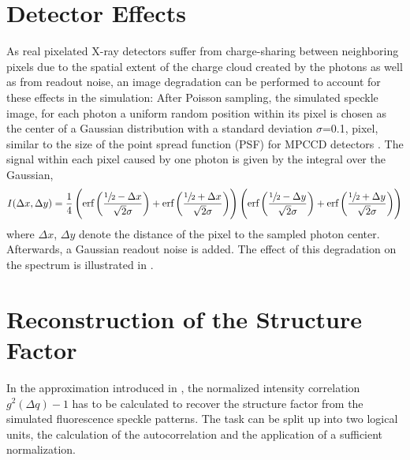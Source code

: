\section{Detector Effects}
\label{sec:chargesharing}
As real pixelated X-ray detectors suffer from charge-sharing between neighboring pixels due to the spatial extent of the charge cloud created by the photons as well as from readout noise, an image degradation can be performed to account for these effects in the simulation: After Poisson sampling, the simulated speckle image, for each photon a uniform random position within its pixel is chosen as the center of a Gaussian distribution with a  standard deviation $\sigma$=0.1, pixel, similar to the size of the point spread function (PSF) for MPCCD detectors \cite{mpccd}.
The signal within each pixel caused by one photon is given by the integral over the Gaussian,
\begin{equation*}
	I(\Delta x,\Delta y)=\frac{1}{4} \left(\text{erf}\left(\frac{\sfrac{1}{2}-\Delta x}{\sqrt{2}
		\sigma}\right)+\text{erf}\left(\frac{\sfrac{1}{2}+\Delta x}{\sqrt{2} \sigma}\right)\right) \left(\text{erf}\left(\frac{\sfrac{1}{2}-\Delta y}{\sqrt{2}
		\sigma}\right)+\text{erf}\left(\frac{\sfrac{1}{2}+\Delta y}{\sqrt{2} \sigma}\right)\right)
\end{equation*}
where $\Delta x$, $\Delta y$ denote the distance of the pixel to the sampled photon center. Afterwards, a Gaussian readout noise is added. The effect of this degradation on the spectrum is illustrated in .

\section{Reconstruction of the Structure Factor}
In the approximation introduced in , the normalized intensity correlation $g^2(\Delta q)-1$ has to be calculated to recover the structure factor from the simulated fluorescence speckle patterns. The task can be split up into two logical units, the calculation of the autocorrelation and the application of a sufficient normalization.


